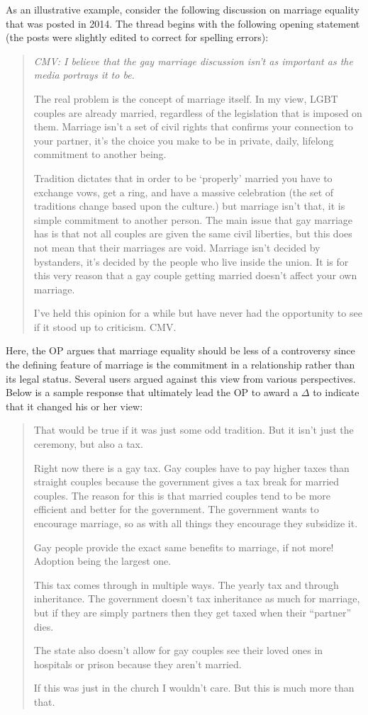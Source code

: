 As an illustrative example, consider the following discussion on marriage equality that was posted in 2014. The thread begins with the following opening statement (the posts were slightly edited to correct for spelling errors):
\begin{quote}\singlespacing
\emph{CMV: I believe that the gay marriage discussion isn't as important as the media portrays it to be.}

The real problem is the concept of marriage itself. In my view, LGBT couples are already married, regardless of the legislation that is imposed on them. Marriage isn't a set of civil rights that confirms your connection to your partner, it's the choice you make to be in private, daily, lifelong commitment to another being.

Tradition dictates that in order to be `properly' married you have to exchange vows, get a ring, and have a massive celebration (the set of traditions change based upon the culture.) but marriage isn't that, it is simple commitment to another person. The main issue that gay marriage has is that not all couples are given the same civil liberties, but this does not mean that their marriages are void. Marriage isn't decided by bystanders, it's decided by the people who live inside the union. It is for this very reason that a gay couple getting married doesn't affect your own marriage.

I've held this opinion for a while but have never had the opportunity to see if it stood up to criticism. CMV.
\end{quote}
Here, the OP argues that marriage equality should be less of a controversy since the defining feature of marriage is the commitment in a relationship rather than its legal status. Several users argued against this view from various perspectives. Below is a sample response that ultimately lead the OP to award a $\Delta$ to indicate that it changed his or her view:
\begin{quote}\singlespacing
That would be true if it was just some odd tradition. But it isn't just the ceremony, but also a tax.

Right now there is a gay tax. Gay couples have to pay higher taxes than straight couples because the government gives a tax break for married couples. The reason for this is that married couples tend to be more efficient and better for the government. The government wants to encourage marriage, so as with all things they encourage they subsidize it.

Gay people provide the exact same benefits to marriage, if not more! Adoption being the largest one.

This tax comes through in multiple ways. The yearly tax and through inheritance. The government doesn't tax inheritance as much for marriage, but if they are simply partners then they get taxed when their ``partner'' dies. 

The state also doesn't allow for gay couples see their loved ones in hospitals or prison because they aren't married.

If this was just in the church I wouldn't care. But this is much more than that.
\end{quote}
